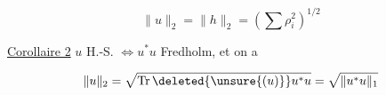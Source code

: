 \[
\boxed{\|u\|_2=\|h\|_2=(\sum\rho_i^2)^{1/2}} \tag*{(19)}
\]



\uline{Corollaire 2} $u$ H.-S. $\Longleftrightarrow u^*u$ Fredholm, et on a

\[
\|u\|_2=\sqrt{\operatorname{Tr}\deleted{\unsure{(u)}}u^*u}=\sqrt{\|u^*u\|_1}
\]

